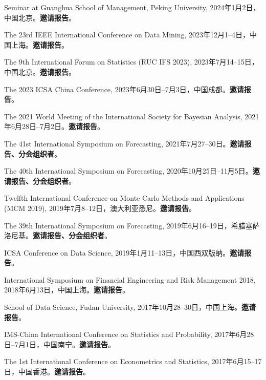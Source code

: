 \documentclass[twoside,a4paper,11pt]{article}
\begin{document}
\begin{etaremune}[itemsep=0ex,parsep=0pt]
\item Seminar at Guanghua School of Management, Peking University, 2024年1月2日，中国北京。\textbf{邀请报告}。

\item The 23rd IEEE International Conference on Data Mining, 2023年12月1--4日，中国上海。\textbf{邀请报告}。

\item The 9th International Forum on Statistics (RUC IFS 2023), 2023年7月14--15日，中国北京。\textbf{邀请报告}。

\item The 2023 ICSA China Conference, 2023年6月30日--7月3日，中国成都。\textbf{邀请报告}。

\item The 2021 World Meeting of the International Society for Bayesian Analysis, 2021年6月28日--7月2日。\textbf{邀请报告}。

\item The 41st International Symposium on Forecasting, 2021年7月27--30日。\textbf{邀请报告、分会组织者}。

\item The 40th International Symposium on Forecasting, 2020年10月25日--11月5日。\textbf{邀请报告、分会组织者}。

\item Twelfth International Conference on Monte Carlo Methods and Applications (MCM 2019),
  2019年7月8--12日，澳大利亚悉尼。\textbf{邀请报告}。

\item The 39th International Symposium on Forecasting, 2019年6月16--19日，希腊塞萨洛尼基。\textbf{邀请报告、分会组织者}。

\item ICSA Conference on Data Science, 2019年1月11--13日，中国西双版纳。\textbf{邀请报告}。

\item International Symposium on Financial Engineering and Risk Management 2018, 2018年6月13日，中国上海。\textbf{邀请报告}。

\item School of Data Science, Fudan University, 2017年10月28--30日，中国上海。\textbf{邀请报告}。

\item IMS-China International Conference on Statistics and Probability, 2017年6月28日--7月1日，中国南宁。\textbf{邀请报告}。

\item The 1st International Conference on Econometrics and Statistics, 2017年6月15--17日，中国香港。\textbf{邀请报告}。


\end{etaremune}
\end{document}
